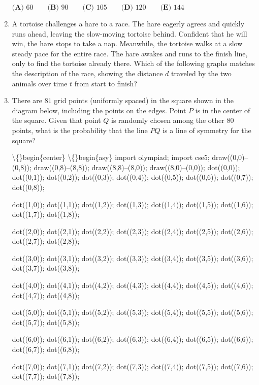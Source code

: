\documentclass{article}
\begin{document}
\begin{enumerate}[label=\arabic*., itemsep=0.5em]
\(\textbf{(A) }60\qquad\textbf{(B) }90\qquad\textbf{(C) }105\qquad\textbf{(D) }120\qquad\textbf{(E) }144\)\par \vspace{0.5em}\item A tortoise challenges a hare to a race. The hare eagerly agrees and quickly runs ahead, leaving the slow-moving tortoise behind. Confident that he will win, the hare stops to take a nap. Meanwhile, the tortoise walks at a slow steady pace for the entire race. The hare awakes and runs to the finish line, only to find the tortoise already there. Which of the following graphs matches the description of the race, showing the distance \(d\) traveled by the two animals over time \(t\) from start to finish?\par \vspace{0.5em}\item There are \(81\) grid points (uniformly spaced) in the square shown in the diagram below, including the points on the edges. Point \(P\) is in the center of the square. Given that point \(Q\) is randomly chosen among the other \(80\) points, what is the probability that the line \(PQ\) is a line of symmetry for the square?


\textbackslash\{\}begin\{center\}
\textbackslash\{\}begin\{asy\}
import olympiad;
import cse5;
draw((0,0)--(0,8));
draw((0,8)--(8,8));
draw((8,8)--(8,0));
draw((8,0)--(0,0));
dot((0,0));
dot((0,1));
dot((0,2));
dot((0,3));
dot((0,4));
dot((0,5));
dot((0,6));
dot((0,7));
dot((0,8));

dot((1,0));
dot((1,1));
dot((1,2));
dot((1,3));
dot((1,4));
dot((1,5));
dot((1,6));
dot((1,7));
dot((1,8));

dot((2,0));
dot((2,1));
dot((2,2));
dot((2,3));
dot((2,4));
dot((2,5));
dot((2,6));
dot((2,7));
dot((2,8));

dot((3,0));
dot((3,1));
dot((3,2));
dot((3,3));
dot((3,4));
dot((3,5));
dot((3,6));
dot((3,7));
dot((3,8));

dot((4,0));
dot((4,1));
dot((4,2));
dot((4,3));
dot((4,4));
dot((4,5));
dot((4,6));
dot((4,7));
dot((4,8));

dot((5,0));
dot((5,1));
dot((5,2));
dot((5,3));
dot((5,4));
dot((5,5));
dot((5,6));
dot((5,7));
dot((5,8));

dot((6,0));
dot((6,1));
dot((6,2));
dot((6,3));
dot((6,4));
dot((6,5));
dot((6,6));
dot((6,7));
dot((6,8));

dot((7,0));
dot((7,1));
dot((7,2));
dot((7,3));
dot((7,4));
dot((7,5));
dot((7,6));
dot((7,7));
dot((7,8));


\end{enumerate}
\end{document}

